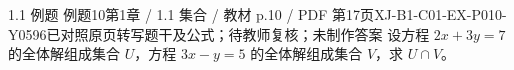 \par\noindent\begin{minipage}{\linewidth}
\begin{bankitem}{1.1 例题 例题10}{第1章 / 1.1 集合 / 教材 p.10 / PDF 第17页}{XJ-B1-C01-EX-P010-Y0596}{已对照原页转写题干及公式；待教师复核；未制作答案}
设方程 $2x+3y=7$ 的全体解组成集合 $U$，方程 $3x-y=5$ 的全体解组成集合 $V$，求 $U\cap V$。
\end{bankitem}
\end{minipage}\par\medskip
